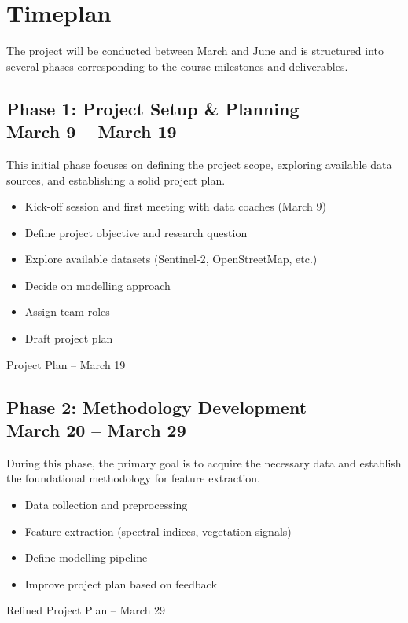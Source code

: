\documentclass[12pt]{article}
\begin{document}
\section{Timeplan}

The project will be conducted between March and June and is structured into several phases corresponding to the course milestones and deliverables.

\subsection[Phase 1: Project Setup \& Planning]{Phase 1: Project Setup \& Planning \\ \normalsize March 9 – March 19}
This initial phase focuses on defining the project scope, exploring available data sources, and establishing a solid project plan.

\begin{description}[style=multiline, leftmargin=3cm, font=\normalfont\textbf]
    \item[Tasks:] 
    \begin{itemize}[nosep, leftmargin=*]
        \item Kick-off session and first meeting with data coaches (March 9)
        \item Define project objective and research question
        \item Explore available datasets (Sentinel-2, OpenStreetMap, etc.)
        \item Decide on modelling approach
        \item Assign team roles
        \item Draft project plan
    \end{itemize}
    \item[Deliverable:] Project Plan -- March 19
\end{description}

\subsection[Phase 2: Methodology Development]{Phase 2: Methodology Development \\ \normalsize March 20 – March 29}
During this phase, the primary goal is to acquire the necessary data and establish the foundational methodology for feature extraction.

\begin{description}[style=multiline, leftmargin=3cm, font=\normalfont\textbf]
    \item[Tasks:] 
    \begin{itemize}[nosep, leftmargin=*]
        \item Data collection and preprocessing
        \item Feature extraction (spectral indices, vegetation signals)
        \item Define modelling pipeline
        \item Improve project plan based on feedback
    \end{itemize}
    \item[Deliverable:] Refined Project Plan -- March 29
\end{description}
\end{document}
